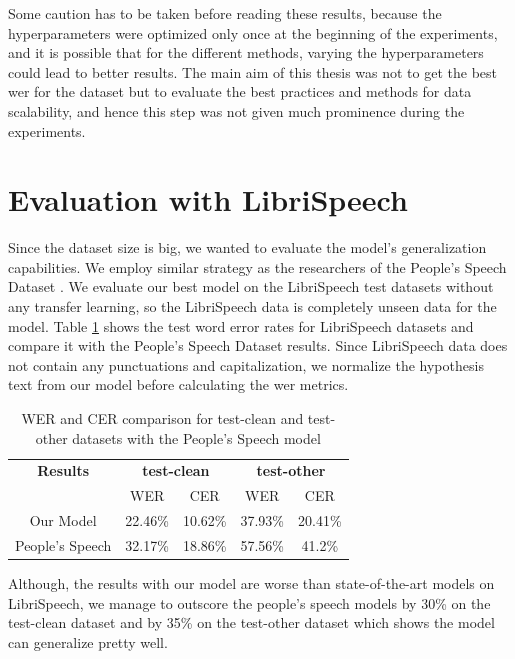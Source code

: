 Some caution has to be taken before reading these results, because the hyperparameters were optimized only once at the beginning of the experiments, and it is possible that for the different methods, varying the hyperparameters could lead to better results. The main aim of this thesis was not to get the best \acrshort{wer} for the dataset but to evaluate the best practices and methods for data scalability, and hence this step was not given much prominence during the experiments. 

\section{Evaluation with LibriSpeech}
Since the dataset size is big, we wanted to evaluate the model's generalization capabilities. We employ similar strategy as the researchers of the People's Speech Dataset \cite{Galvez2021TheUsage}. We evaluate our best model on the LibriSpeech\cite{Panayotov2015Librispeech:Books} test datasets without any transfer learning, so the LibriSpeech data is completely unseen data for the model. Table \ref{table:libri} shows the test word error rates for LibriSpeech datasets and compare it with the People's Speech Dataset results. Since LibriSpeech data does not contain any punctuations and capitalization, we normalize the hypothesis text from our model before calculating the \acrshort{wer} metrics. 

\begin{table}[ht]
\centering
\begin{tabular}{c | c c | c c }
\hline
\textbf{Results} & \multicolumn{2}{c|}{\textbf{test-clean}} & \multicolumn{2}{c}{\textbf{test-other}}\\\cline{2-5}
    & WER & CER & WER & CER\\
 \hline
  Our Model & 22.46\% & 10.62\% & 37.93\% & 20.41\%\\
  People's Speech \cite{Galvez2021TheUsage} & 32.17\% & 18.86\% & 57.56\% & 41.2\% \\
 \hline
\end{tabular}
\caption{\label{table:libri} WER and CER comparison for test-clean and test-other datasets with the People's Speech model}
\end{table}

Although, the results with our model are worse than state-of-the-art models on LibriSpeech, we manage to outscore the people's speech models by 30\% on the test-clean dataset and by 35\% on the test-other dataset which shows the model can generalize pretty well.

